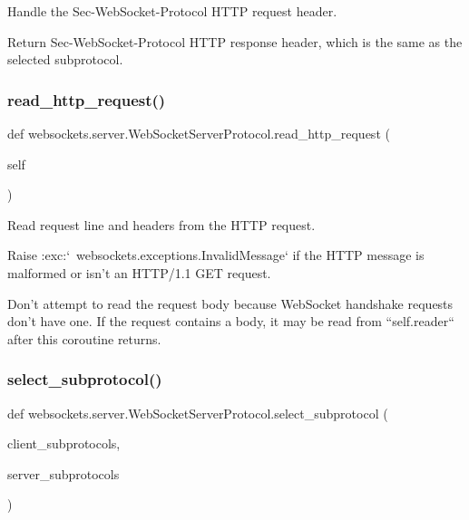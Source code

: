 \begin{DoxyVerb}Handle the Sec-WebSocket-Protocol HTTP request header.

Return Sec-WebSocket-Protocol HTTP response header, which is the same
as the selected subprotocol.\end{DoxyVerb}
 \mbox{\label{classwebsockets_1_1server_1_1_web_socket_server_protocol_a00330bf7ea1eb9379ba86472cf5c2168}} 
\subsubsection{\texorpdfstring{read\+\_\+http\+\_\+request()}{read\_http\_request()}}
{\footnotesize\ttfamily def websockets.\+server.\+Web\+Socket\+Server\+Protocol.\+read\+\_\+http\+\_\+request (\begin{DoxyParamCaption}\item[{}]{self }\end{DoxyParamCaption})}

\begin{DoxyVerb}Read request line and headers from the HTTP request.

Raise :exc:`~websockets.exceptions.InvalidMessage` if the HTTP message
is malformed or isn't an HTTP/1.1 GET request.

Don't attempt to read the request body because WebSocket handshake
requests don't have one. If the request contains a body, it may be
read from ``self.reader`` after this coroutine returns.\end{DoxyVerb}
 \mbox{\label{classwebsockets_1_1server_1_1_web_socket_server_protocol_ae54969ad0cf329585d75b8eb81b04d82}} 
\subsubsection{\texorpdfstring{select\+\_\+subprotocol()}{select\_subprotocol()}}
{\footnotesize\ttfamily def websockets.\+server.\+Web\+Socket\+Server\+Protocol.\+select\+\_\+subprotocol (\begin{DoxyParamCaption}\item[{}]{client\+\_\+subprotocols,  }\item[{}]{server\+\_\+subprotocols }\end{DoxyParamCaption})\hspace{0.3cm}{\ttfamily [static]}}

